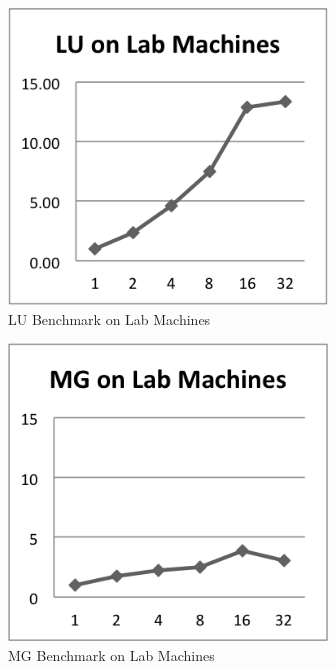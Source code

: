 \documentclass{acm_proc_article-sp}
\begin{document}
\begin{figure}[tbp]
  \centering
  \caption{LU Benchmark on Lab Machines}
	\label{LabLU}
  \includegraphics[width=20pc]{Pics-Lab/LU.png}
\end{figure}

\begin{figure}[tbp]
  \centering
  \caption{MG Benchmark on Lab Machines}
	\label{LabMG}
  \includegraphics[width=20pc]{Pics-Lab/MG.png}
\end{figure}
\end{document}
